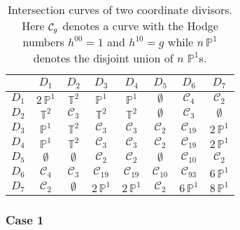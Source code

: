 \documentclass[11pt,a4paper]{article}
\def\T{{\mathbb T}}
\def\P{{\mathbb P}}
\newcommand{\mc}{\mathcal}
\begin{document}
\begin{table}[H]
  \centering
 \begin{tabular}{|c|c|c|c|c|c|c|c|}
 \hline
  & $D_1$  & $D_2$  & $D_3$  & $D_4$  & $D_5$ & $D_6$  & $D_7$       \\
 \hline
 \hline
 $D_1$ & $2\,\P^1$   & $\T^2$        & $\P^1$          & $\P^1$          & $\emptyset$     & $\mc{C}_4$       & $\mc{C}_2$  \\
 $D_2$ & $\T^2$      & $\mc{C}_3$    & $\T^2$          & $\T^2$          & $\emptyset$     & $\mc{C}_3$       & $\emptyset$   \\
 $D_3$ & $\P^1$      & $\T^2$        & $\mc{C}_3$      & $\mc{C}_3$      & $\mc{C}_2$      & $\mc{C}_{19}$    & $2\, \P^1$  \\
 $D_4$ & $\P^1$      & $\T^2$        & $\mc{C}_3$      & $\mc{C}_3$      & $\mc{C}_2$      & $\mc{C}_{19}$    & $2\, \P^1$  \\
 $D_5$ & $\emptyset$ & $\emptyset$   & $\mc{C}_2$      & $\mc{C}_2$      & $\emptyset$     & $\mc{C}_{10}$    & $\mc{C}_2$  \\
 $D_6$ & $\mc{C}_4$  & $\mc{C}_3$    & $\mc{C}_{19}$   & $\mc{C}_{19}$   & $\mc{C}_{10}$   & $\mc{C}_{93}$    & $6\,\P^1$  \\
 $D_7$ & $\mc{C}_2$  & $\emptyset$   & $2\,\P^1$       & $2\,\P^1$       & $\mc{C}_2$      & $6\,\P^1$        & $8\,\P^1$  \\
\hline
\end{tabular}
\caption{Intersection curves of two coordinate divisors. Here ${\cal C}_g$ denotes a curve with the Hodge numbers $h^{00} = 1$ and $h^{10} = g$ while $n\,\P^1$ denotes the disjoint union of $n$ $\P^1$s.}
\label{Tab7}
\end{table}

\subsubsection{Case 1}
\end{document}
